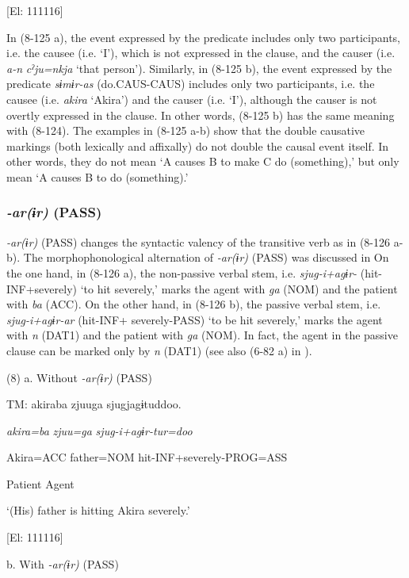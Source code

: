       [El: 111116]

In (8-125 a), the event expressed by the predicate includes only two participants, i.e. the causee (i.e. ‘I’), which is not expressed in the clause, and the causer (i.e. \textit{a-n} \textit{cˀju=nkja} ‘that person’). Similarly, in (8-125 b), the event expressed by the predicate \textit{sɨmɨr-as} (do.CAUS-CAUS) includes only two participants, i.e. the causee (i.e. \textit{akira} ‘Akira’) and the causer (i.e. ‘I’), although the causer is not overtly expressed in the clause. In other words, (8-125 b) has the same meaning with (8-124). The examples in (8-125 a-b) show that the double causative markings (both lexically and affixally) do not double the causal event itself. In other words, they do not mean ‘A causes B to make C do (something),’ but only mean ‘A causes B to do (something).’

\subsubsection{\textit{{}-ar(ɨr)} (PASS)}

\textit{{}-ar(ɨr)} (PASS) changes the syntactic valency of the transitive verb as in (8-126 a-b). The morphophonological alternation of \textit{{}-ar(ɨr)} (PASS) was discussed in  On the one hand, in (8-126 a), the non-passive verbal stem, i.e. \textit{sjug-i+agɨr-} (hit-INF+severely) ‘to hit severely,’ marks the agent with \textit{ga} (NOM) and the patient with \textit{ba} (ACC). On the other hand, in (8-126 b), the passive verbal stem, i.e. \textit{sjug-i+agɨr-ar} (hit-INF+ severely-PASS) ‘to be hit severely,’ marks the agent with \textit{n} (DAT1) and the patient with \textit{ga} (NOM). In fact, the agent in the passive clause can be marked only by \textit{n} (DAT1) (see also (6-82 a) in ).

(8)  a.  Without \textit{{}-ar(ɨr)} (PASS)

    TM:  akiraba  zjuuga  sjugjagɨtuddoo.

      \textit{akira=ba}  \textit{zjuu=ga}  \textit{sjug-i+agɨr{}-tur=doo}

      Akira=ACC  father=NOM  hit-INF+severely-PROG=ASS

      Patient  Agent  

      ‘(His) father is hitting Akira severely.’

      [El: 111116]

  b.  With \textit{{}-ar(ɨr)} (PASS)

